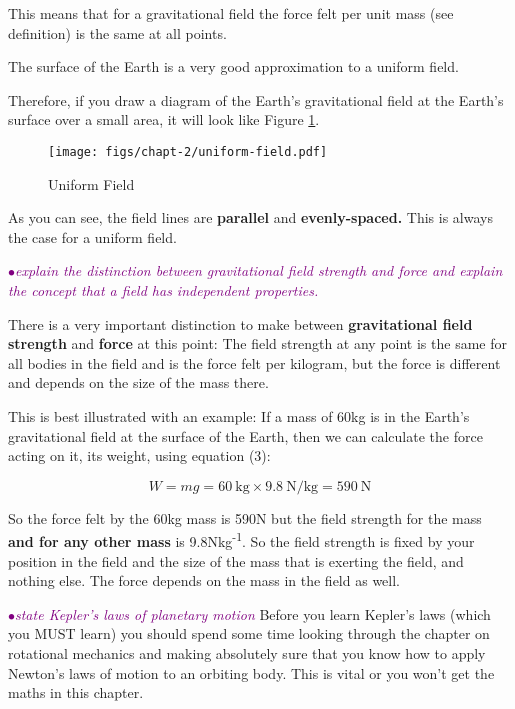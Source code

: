 \documentclass[a4paper,11pt,twoside]{memoir}
\newcounter{spec}[chapter]
\newcommand{\spec}[1]{\Needspace{5\baselineskip}\textcolor{purple}{$\bullet$\hspace{0.5cm}\textit{#1}}}
\begin{document}
This means that for a gravitational field the force felt per unit mass
(see definition) is the same at all points.

The surface of the Earth is a very good approximation to a uniform
field.

Therefore, if you draw a diagram of the Earth's gravitational field at
the Earth's surface over a small area, it will look like Figure \ref{fig:uniform-field}.

\begin{figure}[!h]
	\begin{center}
		\texttt{[image: figs/chapt-2/uniform-field.pdf]}
	\end{center}
	\caption{Uniform Field}
	\label{fig:uniform-field}
\end{figure}

As you can see, the field lines are \textbf{parallel} and
\textbf{evenly-spaced.} This is always the case for a uniform field.

\spec{explain the distinction between gravitational field strength and force and explain the concept that a field has independent properties.}

There is a very important distinction to make between
\textbf{gravitational field strength} and \textbf{force} at this point:
The field strength at any point is the same for all bodies in the field
and is the force felt per kilogram, but the force is different and
depends on the size of the mass there.

This is best illustrated with an example: If a mass of 60kg is in the
Earth's gravitational field at the surface of the Earth, then we can
calculate the force acting on it, its weight, using equation (3):

\[W = mg = \SI{60}{\kg} \times \SI{9.8}{\N\per\kg} = \SI{590}{\N}\]

So the force felt by the 60kg mass is 590N but the field strength for
the mass \textbf{and for any other mass} is 9.8Nkg\textsuperscript{-1}.
So the field strength is fixed by your position in the field and the
size of the mass that is exerting the field, and nothing else. The force
depends on the mass in the field as well.

\spec{state Kepler's laws of planetary motion}
Before you learn Kepler's laws (which you MUST learn) you should spend
some time looking through the chapter on rotational mechanics and making
absolutely sure that you know how to apply Newton's laws of motion to an
orbiting body. This is vital or you won't get the maths in this chapter.
\end{document}
